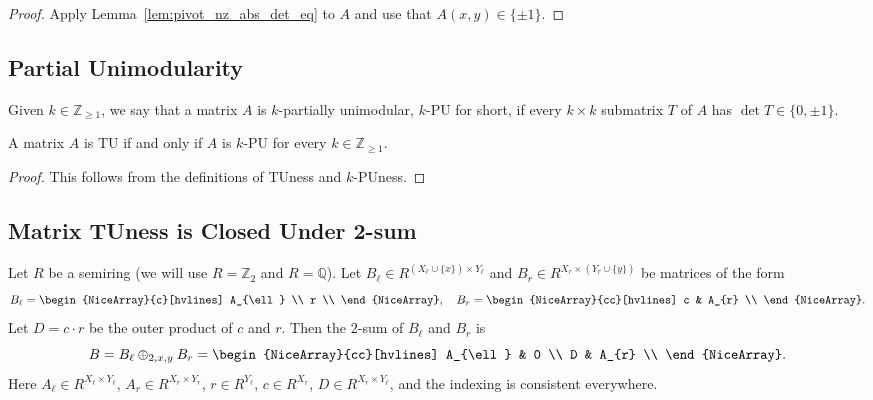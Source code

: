 \begin{proof}
    Apply Lemma~\ref{lem:pivot_nz_abs_det_eq} to $A$ and use that $A (x, y) \in \{\pm 1\}$.
\end{proof}

\subsection{Partial Unimodularity}

\begin{definition}\label{def:p_tu}
    Given $k \in \mathbb{Z}_{\geq 1}$, we say that a matrix $A$ is $k$-partially unimodular, $k$-PU for short, if every $k \times k$ submatrix $T$ of $A$ has $\det T \in \{0, \pm 1\}$.
\end{definition}

\begin{lemma}\label{lem:tu_iff_all_p_tu}
    A matrix $A$ is TU if and only if $A$ is $k$-PU for every $k \in \mathbb{Z}_{\geq 1}$.
\end{lemma}

\begin{proof}
    This follows from the definitions of TUness and $k$-PUness.
\end{proof}


\subsection{Matrix TUness is Closed Under 2-sum}

\begin{definition}\label{def:two_sum}
    Let $R$ be a semiring (we will use $R = \mathbb{Z}_{2}$ and $R = \mathbb{Q}$). Let $B_{\ell} \in R^{(X_{\ell} \cup \{x\}) \times Y_{\ell}}$ and $B_{r} \in R^{X_{r} \times (Y_{r} \cup \{y\})}$ be matrices of the form
    \[
        B_{\ell} = \begin{NiceArray}{c}[hvlines] A_{\ell} \\ r \\ \end{NiceArray}, \quad
        B_{r} = \begin{NiceArray}{cc}[hvlines] c & A_{r} \\ \end{NiceArray}.
    \]
    Let $D = c \cdot r$ be the outer product of $c$ and $r$. Then the $2$-sum of $B_{\ell}$ and $B_{r}$ is
    \[
        B = B_{\ell} \oplus_{2, x, y} B_{r} = \begin{NiceArray}{cc}[hvlines] A_{\ell} & 0 \\ D & A_{r} \\ \end{NiceArray}.
    \]
    Here $A_{\ell} \in R^{X_{\ell} \times Y_{\ell}}$, $A_{r} \in R^{X_{r} \times Y_{r}}$, $r \in R^{Y_{\ell}}$, $c \in R^{X_{r}}$, $D \in R^{X_{r} \times Y_{\ell}}$, and the indexing is consistent everywhere.
\end{definition}

